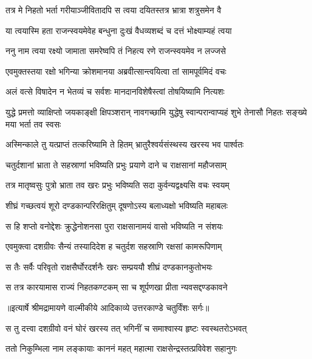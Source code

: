 \twolineshloka
{तत्र मे निहतो भर्ता गरीयाञ्जीवितादपि}
{स त्वया दयितस्तत्र भ्रात्रा शत्रुसमेन वै} %

\twolineshloka
{या त्वयास्मि हता राजन्स्वयमेवेह बन्धुना}
{दुःखं वैधव्यशब्दं च दत्तं भोक्ष्याम्यहं त्वया} %

\twolineshloka
{ननु नाम त्वया रक्ष्यो जामाता समरेष्वपि}
{तं निहत्य रणे राजन्स्वयमेव न लज्जसे} %

\twolineshloka
{एवमुक्तस्तया रक्षो भगिन्या क्रोशमानया}
{अब्रवीत्सान्त्वयित्वा तां सामपूर्वमिदं वचः} %

\twolineshloka
{अलं वत्से विषादेन न भेतव्यं च सर्वशः}
{मानदानविशेषैस्त्वां तोषयिष्यामि नित्यशः} %

\threelineshloka
{युद्धे प्रमत्तो व्याक्षिप्तो जयकाङ्क्षी क्षिपञ्शरान्}
{नावगच्छामि युद्धेषु स्वान्परान्वाप्यहं शुभे}
{तेनासौ निहतः सङ्ख्ये मया भर्ता तव स्वसः} %

\twolineshloka
{अस्मिन्काले तु यत्प्राप्तं तत्करिष्यामि ते हितम्}
{भ्रातुरैश्वर्यसंस्थस्य खरस्य भव पार्श्वतः} %

\twolineshloka
{चतुर्दशानां भ्राता ते सहस्राणां भविष्यति}
{प्रभुः प्रयाणे दाने च राक्षसानां महौजसाम्} %

\twolineshloka
{तत्र मातृष्वसुः पुत्रो भ्राता तव खरः प्रभुः}
{भविष्यति सदा कुर्वन्यद्वक्ष्यसि वचः स्वयम्} %

\twolineshloka
{शीघ्रं गच्छत्वयं शूरो दण्डकान्परिरक्षितुम्}
{दूषणोऽस्य बलाध्यक्षो भविष्यति महाबलः} %

\twolineshloka
{स हि शप्तो वनोद्देशः क्रुद्धेनोशनसा पुरा}
{राक्षसानामयं वासो भविष्यति न संशयः} %

\twolineshloka
{एवमुक्त्वा दशग्रीवः सैन्यं तस्यादिदेश ह}
{चतुर्दश सहस्राणि रक्षसां कामरूपिणाम्} %

\twolineshloka
{स तैः सर्वैः परिवृतो राक्षसैर्घोरदर्शनैः}
{खरः सम्प्रययौ शीघ्रं दण्डकानकुतोभयः} %

\twolineshloka
{स तत्र कारयामास राज्यं निहतकण्टकम्}
{सा च शूर्पणखा प्रीता न्यवसद्दण्डकावने} %


{॥इत्यार्षे श्रीमद्रामायणे वाल्मीकीये आदिकाव्ये उत्तरकाण्डे चतुर्विंशः सर्गः॥}


\twolineshloka
{स तु दत्त्वा दशग्रीवो वनं घोरं खरस्य तत्}
{भगिनीं च समाश्वास्य हृष्टः स्वस्थतरोऽभवत्} %

\twolineshloka
{ततो निकुम्भिला नाम लङ्कायाः काननं महत्}
{महात्मा राक्षसेन्द्रस्तत्प्रविवेश सहानुगः} %

